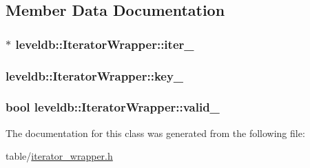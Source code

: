 \subsection{Member Data Documentation}
\hypertarget{classleveldb_1_1_iterator_wrapper_a167c198349e18c74de31f3b5041ab5eb}{}
\subsubsection[{iter\+\_\+}]{$\ast$ leveldb\+::\+Iterator\+Wrapper\+::iter\+\_\+\hspace{0.3cm}{\ttfamily [private]}}\label{classleveldb_1_1_iterator_wrapper_a167c198349e18c74de31f3b5041ab5eb}
\hypertarget{classleveldb_1_1_iterator_wrapper_a2f21505d8ed93356a2290526d8894850}{}
\subsubsection[{key\+\_\+}]{ leveldb\+::\+Iterator\+Wrapper\+::key\+\_\+\hspace{0.3cm}{\ttfamily [private]}}\label{classleveldb_1_1_iterator_wrapper_a2f21505d8ed93356a2290526d8894850}
\hypertarget{classleveldb_1_1_iterator_wrapper_ab55d69f29a486d72c29319245cece3e9}{}
\subsubsection[{valid\+\_\+}]{\setlength{\rightskip}{0pt plus 5cm}bool leveldb\+::\+Iterator\+Wrapper\+::valid\+\_\+\hspace{0.3cm}{\ttfamily [private]}}\label{classleveldb_1_1_iterator_wrapper_ab55d69f29a486d72c29319245cece3e9}


The documentation for this class was generated from the following file\+:\begin{DoxyCompactItemize}
\item 
table/\hyperlink{iterator__wrapper_8h}{iterator\+\_\+wrapper.\+h}\end{DoxyCompactItemize}
